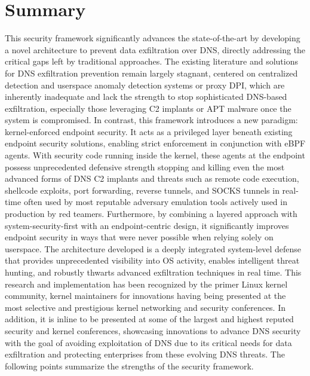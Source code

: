 \documentclass [11pt, proquest] {uwthesis}[2020/02/24]
\begin{document}
\section{Summary}
This security framework significantly advances the state-of-the-art by developing a novel architecture to prevent data exfiltration over DNS, directly addressing the critical gaps left by traditional approaches. The existing literature and solutions for DNS exfiltration prevention remain largely stagnant, centered on centralized detection and userspace anomaly detection systems or proxy DPI, which are inherently inadequate and lack the strength to stop sophisticated DNS-based exfiltration, especially those leveraging C2 implants or APT malware once the system is compromised. In contrast, this framework introduces a new paradigm: kernel-enforced endpoint security. It acts as a privileged layer beneath existing endpoint security solutions, enabling strict enforcement in conjunction with eBPF agents. With security code running inside the kernel, these agents at the endpoint possess unprecedented defensive strength stopping and killing even the most advanced forms of DNS C2 implants and threats such as remote code execution, shellcode exploits, port forwarding, reverse tunnels, and SOCKS tunnels in real-time often used by most reputable adversary emulation tools actively used in production by red teamers.
Furthermore, by combining a layered approach with system-security-first with an endpoint-centric design, it significantly improves endpoint security in ways that were never possible when relying solely on userspace. The architecture developed is a deeply integrated system-level defense that provides unprecedented visibility into OS activity, enables intelligent threat hunting, and robustly thwarts advanced exfiltration techniques in real time. This research and implementation has been recognized by the primer Linux kernel community, kernel maintainers for innovations having being presented at the most selective and prestigious kernel networking and security conferences. In addition, it is inline to be presented at some of the largest and highest reputed security and kernel conferences, showcasing innovations to advance DNS security with the goal of avoiding exploitation of DNS due to its critical needs for data exfiltration and protecting enterprises from these evolving DNS threats. The following points summarize the strengths of the security framework.
\end{document}
